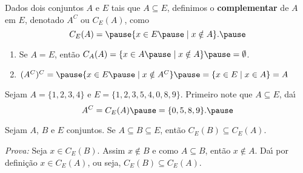 \documentclass{beamer}
\begin{document}
    \begin{frame}
        \begin{definicao}
        Dados dois conjuntos $A$ e $E$ \pause tais que $A\subseteq E$, \pause definimos o \textbf{complementar} \pause de $A$ em $E$, denotado $A^C$ ou $C_E(A)$, como\pause
        \[
            C_E(A) = \pause \{ x \in E \pause \mid x \notin A \}.\pause
        \]
        \end{definicao}

        \begin{observacoes}
            \begin{enumerate}[label={\arabic*})]
                \item Se $A = E$, \pause ent{\~a}o $C_A(A) = \{ x \in A \pause \mid x \notin A \} \pause = \emptyset$.\pause
                \item $(A^C)^C = \pause \{x \in E \pause \mid x \notin A^C\} \pause = \{ x \in E \mid x \in A \} = A$\pause
            \end{enumerate}
            
        \end{observacoes}
    \end{frame}

    \begin{frame}
        \begin{exemplo}
            Sejam $A = \{1,2,3,4\}$ \pause e $E = \{1,2,3,5,4,0,8,9\}$. \pause Primeiro note que $A \subseteq E$, \pause da{\'\i}
            \[
                    A^C = C_E(A) \pause = \{0,5,8,9\}.\pause
            \]
        \end{exemplo}
    
        \begin{proposicao}
            Sejam $A$, $B$ e $E$ conjuntos. \pause Se $A\subseteq B\subseteq E$, \pause ent{\~a}o $C_E(B)\subseteq C_E(A)$.\pause
        \end{proposicao}
        \textit{Prova: }\pause
            Seja $x \in C_E(B)$. \pause Assim $x\notin B$ \pause e como $A \subseteq B$, \pause ent\~ao $x \notin A$. \pause Da{\'\i} por defini\c{c}\~ao $x\in C_E(A)$, \pause ou seja, $C_E(B) \subseteq C_E(A)$.\qedsymbol\pause
    \end{frame}
\end{document}
